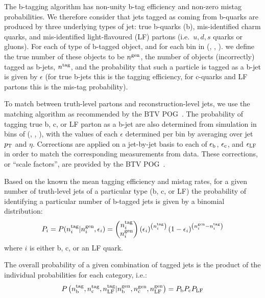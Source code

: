 The b-tagging algorithm has non-unity b-tag efficiency and non-zero mistag probabilities.
We therefore consider that jets tagged as coming from b-quarks are produced by
three underlying types of jet: true b-quarks (b), mis-identified charm quarks,
and mis-identified light-flavoured (LF) partons (i.e.\ $u,d,s$ quarks or gluons).
For each of type of b-tagged object, and for each bin in (\njet , \scalht, \mht).  
we define the true number of these objects
to be $n^{\rm gen}$, the number of objects (incorrectly) tagged as b-jets, 
$n^{\rm tag}$, and the probability that such a particle is tagged as a b-jet
is given by $\epsilon$ (for true b-jets this is the tagging efficiency, for 
c-quarks and LF partons this is the mis-tag probability).

To match between truth-level partons and reconstruction-level jets, we use 
the matching algorithm as recommended by the BTV POG~\cite{btagMCTools}.
The probability of tagging true b, c, or LF parton as a b-jet 
are also determined from simulation in bins of (\njet, \scalht, \mht),
with the values of each $\epsilon$ determined per bin by averaging over jet 
$p_{\rm T}$ and $\eta$. Corrections are applied on a jet-by-jet basis to
each of $\epsilon_{\rm b}$, $\epsilon_{\rm c}$, and $\epsilon_{\rm
  LF}$ in order to match the corresponding measurements from
data. These corrections, or ``scale factors'', are provided by the BTV
POG~\cite{btagMCTools}.

Based on the known the mean tagging efficiency and mistag rates, for a given
number of truth-level jets of a particular type (b, c, or LF) the probability of
identifying a particular number of b-tagged jets is given by a binomial distribution:
\begin{equation}
P_i = P(n_{i}^{\rm tag}| n_{i}^{\rm gen}, \epsilon_{i}) =
     \left(\begin{matrix}n_{i}^{\rm tag} \\ n_{i}^{\rm gen}\end{matrix}\right)
     \left(\epsilon_i\right)^{\left(n_{i}^{\rm tag}\right)}
     \left(1 - \epsilon_i\right)^{\left(n_{i}^{\rm gen} - n_{i}^{\rm tag}\right)}
\end{equation}
where $i$ is either b, c, or an LF quark.

The overall probability of a given combination of tagged jets is the product of
the individual probabilities for each category, i.e.:
\begin{equation}
	P\left(n_{\rm b}^{\rm tag},  n_{\rm c}^{\rm tag}, n_{\rm LF}^{\rm tag}| 
  n_{\rm b}^{\rm gen},  n_{\rm c}^{\rm gen}, n_{\rm LF}^{\rm gen}\right) = 
	P_{\rm b} P_{\rm c} P_{\rm LF} 
\end{equation}


